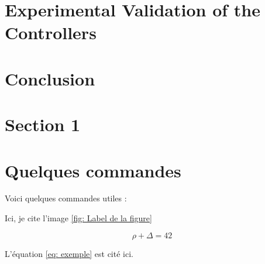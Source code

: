 \documentclass{rapportCS}
\begin{document}
\section{Experimental Validation of the Controllers}
\lipsum[7-9]





\newpage

\section{Conclusion}
\lipsum[10-11]





\newpage

\section{Section 1}




\section{Quelques commandes}

Voici quelques commandes utiles :



Ici, je cite l'image \ref{fig: Label de la figure}



\begin{equation} \label{eq: exemple}
\rho + \Delta = 42
\end{equation}

L'équation \ref{eq: exemple} est cité ici. 
\end{document}
